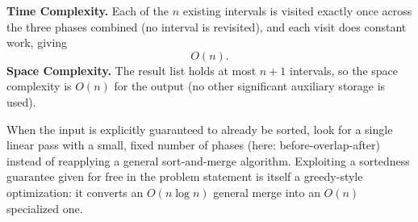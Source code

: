 \begin{complexitybox}
\textbf{Time Complexity.} Each of the $n$ existing intervals is visited
exactly once across the three phases combined (no interval is revisited),
and each visit does constant work, giving
\[
  O(n).
\]
\textbf{Space Complexity.} The result list holds at most $n+1$ intervals, so
the space complexity is $O(n)$ for the output (no other significant
auxiliary storage is used).
\end{complexitybox}

\begin{takeawaybox}
When the input is explicitly guaranteed to already be sorted, look for a
single linear pass with a small, fixed number of phases (here:
before-overlap-after) instead of reapplying a general sort-and-merge
algorithm. Exploiting a sortedness guarantee given for free in the problem
statement is itself a greedy-style optimization: it converts an
$O(n \log n)$ general merge into an $O(n)$ specialized one.
\end{takeawaybox}
